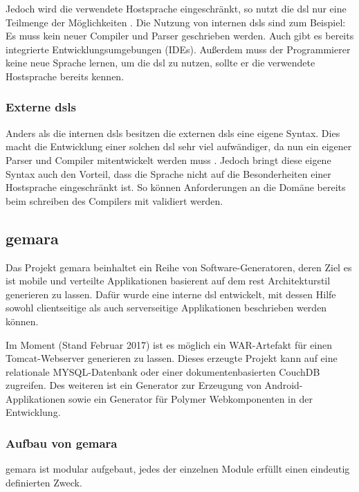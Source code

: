 Jedoch wird die verwendete Hostsprache eingeschränkt, so nutzt die \acl{dsl} nur eine Teilmenge der Möglichkeiten \cite{dsl}. Die Nutzung von internen \acsp{dsl} sind zum Beispiel: Es muss kein neuer Compiler und Parser geschrieben werden. Auch gibt es bereits integrierte Entwicklungsumgebungen (IDEs). Außerdem muss der Programmierer keine neue Sprache lernen, um die \acl{dsl} zu nutzen, sollte er die verwendete Hostsprache bereits kennen. 

\subsubsection{Externe \acsp{dsl}} \label{sec:extern}

Anders als die internen \acsp{dsl} besitzen die externen \acsp{dsl} eine eigene Syntax. Dies macht die Entwicklung einer solchen \acl{dsl} sehr viel aufwändiger, da nun ein eigener Parser und Compiler mitentwickelt werden muss \cite{dsl}. Jedoch bringt diese eigene Syntax auch den Vorteil, dass die Sprache nicht auf die Besonderheiten einer Hostsprache eingeschränkt ist. So können Anforderungen an die Domäne bereits beim schreiben des Compilers mit validiert werden.

\subsection{\acf{gemara}}\label{sec:gemara}

Das Projekt \acs{gemara} beinhaltet ein Reihe von Software-Generatoren, deren Ziel es ist mobile und verteilte Applikationen basierent auf dem \acs{rest} Architekturstil generieren zu lassen. Dafür wurde eine interne \acs{dsl} entwickelt, mit dessen Hilfe sowohl clientseitige als auch serverseitige Applikationen beschrieben werden können.

Im Moment (Stand Februar 2017) ist es möglich ein WAR-Artefakt für einen Tomcat-Webserver generieren zu lassen. Dieses erzeugte Projekt kann auf eine relationale MYSQL-Datenbank oder einer dokumentenbasierten CouchDB zugreifen. Des weiteren ist ein Generator zur Erzeugung von Android-Applikationen sowie ein Generator für Polymer Webkomponenten in der Entwicklung.

\subsubsection{Aufbau von \acs{gemara}}

\acs{gemara} ist modular aufgebaut, jedes der einzelnen Module erfüllt einen eindeutig definierten Zweck.


